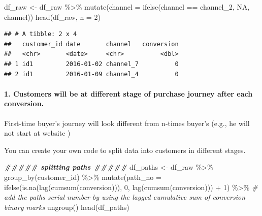 \documentclass[
]{book}
\newenvironment{Shaded}{\begin{snugshade}}{\end{snugshade}}
\newcommand{\AttributeTok}[1]{\textcolor[rgb]{0.77,0.63,0.00}{#1}}
\newcommand{\CommentTok}[1]{\textcolor[rgb]{0.56,0.35,0.01}{\textit{#1}}}
\newcommand{\ConstantTok}[1]{\textcolor[rgb]{0.00,0.00,0.00}{#1}}
\newcommand{\DecValTok}[1]{\textcolor[rgb]{0.00,0.00,0.81}{#1}}
\newcommand{\DocumentationTok}[1]{\textcolor[rgb]{0.56,0.35,0.01}{\textbf{\textit{#1}}}}
\newcommand{\FunctionTok}[1]{\textcolor[rgb]{0.00,0.00,0.00}{#1}}
\newcommand{\NormalTok}[1]{#1}
\newcommand{\OtherTok}[1]{\textcolor[rgb]{0.56,0.35,0.01}{#1}}
\newcommand{\SpecialCharTok}[1]{\textcolor[rgb]{0.00,0.00,0.00}{#1}}
\newcommand{\StringTok}[1]{\textcolor[rgb]{0.31,0.60,0.02}{#1}}
\begin{document}
\begin{Shaded}
\begin{Highlighting}[]
\NormalTok{df\_raw }\OtherTok{\textless{}{-}}\NormalTok{ df\_raw }\SpecialCharTok{\%\textgreater{}\%}
        \FunctionTok{mutate}\NormalTok{(}\AttributeTok{channel =} \FunctionTok{ifelse}\NormalTok{(channel }\SpecialCharTok{==} \StringTok{\textquotesingle{}channel\_2\textquotesingle{}}\NormalTok{, }\ConstantTok{NA}\NormalTok{, channel))}
\FunctionTok{head}\NormalTok{(df\_raw, }\AttributeTok{n =} \DecValTok{2}\NormalTok{)}
\end{Highlighting}
\end{Shaded}

\begin{verbatim}
## # A tibble: 2 x 4
##   customer_id date       channel   conversion
##   <chr>       <date>     <chr>          <dbl>
## 1 id1         2016-01-02 channel_7          0
## 2 id1         2016-01-09 channel_4          0
\end{verbatim}

\hypertarget{customers-will-be-at-different-stage-of-purchase-journey-after-each-conversion.}{%
\paragraph{1. Customers will be at different stage of purchase journey after each conversion.}\label{customers-will-be-at-different-stage-of-purchase-journey-after-each-conversion.}}

First-time buyer's journey will look different from n-times buyer's (e.g., he will not start at website )

You can create your own code to split data into customers in different stages.

\begin{Shaded}
\begin{Highlighting}[]
\DocumentationTok{\#\#\#\#\# splitting paths \#\#\#\#\#}
\NormalTok{df\_paths }\OtherTok{\textless{}{-}}\NormalTok{ df\_raw }\SpecialCharTok{\%\textgreater{}\%}
        \FunctionTok{group\_by}\NormalTok{(customer\_id) }\SpecialCharTok{\%\textgreater{}\%}
        \FunctionTok{mutate}\NormalTok{(}\AttributeTok{path\_no =} \FunctionTok{ifelse}\NormalTok{(}\FunctionTok{is.na}\NormalTok{(}\FunctionTok{lag}\NormalTok{(}\FunctionTok{cumsum}\NormalTok{(conversion))), }\DecValTok{0}\NormalTok{, }\FunctionTok{lag}\NormalTok{(}\FunctionTok{cumsum}\NormalTok{(conversion))) }\SpecialCharTok{+} \DecValTok{1}\NormalTok{) }\SpecialCharTok{\%\textgreater{}\%} \CommentTok{\# add the path\textquotesingle{}s serial number by using the lagged cumulative sum of conversion binary marks}
        \FunctionTok{ungroup}\NormalTok{()}
\FunctionTok{head}\NormalTok{(df\_paths)}
\end{Highlighting}
\end{Shaded}
\end{document}
